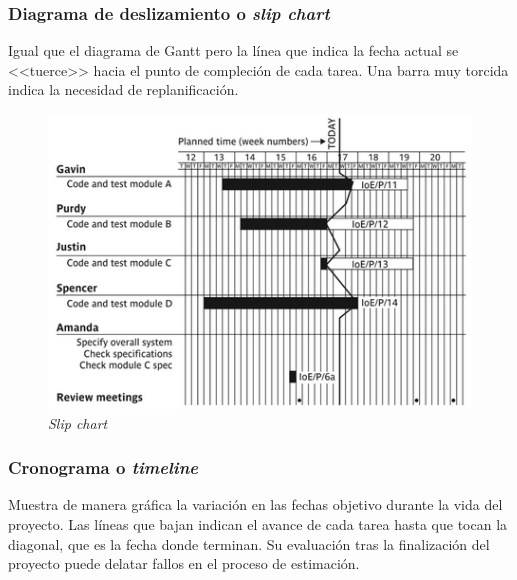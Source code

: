 \documentclass[12pt]{article}
\begin{document}
\subsubsection{Diagrama de deslizamiento o \textit{slip chart}}
\label{9.4.2}

{Igual que el diagrama de Gantt pero la línea que indica la fecha actual se <<tuerce>> hacia el punto de compleción de cada tarea. Una barra muy torcida indica la necesidad de replanificación.}

\begin{figure} [ht]
    \centering
    \includegraphics[keepaspectratio=true, scale=0.75]{images/slip_chart.png}
    \caption{\textit{Slip chart}}
    \label{fig:9.2}
\end{figure}

\subsubsection{Cronograma o \textit{timeline}}
\label{9.4.3}

{Muestra de manera gráfica la variación en las fechas objetivo durante la vida del proyecto. Las líneas que bajan indican el avance de cada tarea hasta que tocan la diagonal, que es la fecha donde terminan. Su evaluación tras la finalización del proyecto puede delatar fallos en el proceso de estimación.}
\end{document}
